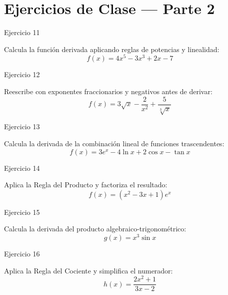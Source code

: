 \documentclass[aspectratio=169]{beamer}
\begin{document}
\section{Ejercicios de Clase — Parte 2}

\begin{frame}{Ejercicio 11}
  \begin{mwejercicio}
    Calcula la función derivada aplicando reglas de potencias y linealidad:
    $$f(x) = 4x^5 - 3x^3 + 2x - 7$$
  \end{mwejercicio}
  \vspace{3.5cm}
\end{frame}
\begin{frame}{Ejercicio 12}
  \begin{mwejercicio}
    Reescribe con exponentes fraccionarios y negativos antes de derivar:
    $$f(x) = 3\sqrt{x} - \frac{2}{x^2} + \frac{5}{\sqrt[3]{x}}$$
  \end{mwejercicio}
  \vspace{3.5cm}
\end{frame}
\begin{frame}{Ejercicio 13}
  \begin{mwejercicio}
    Calcula la derivada de la combinación lineal de funciones trascendentes:
    $$f(x) = 3e^x - 4\ln x + 2\cos x - \tan x$$
  \end{mwejercicio}
  \vspace{3.5cm}
\end{frame}
\begin{frame}{Ejercicio 14}
  \begin{mwejercicio}
    Aplica la Regla del Producto y factoriza el resultado:
    $$f(x) = (x^2 - 3x + 1) e^x$$
  \end{mwejercicio}
  \vspace{3.5cm}
\end{frame}
\begin{frame}{Ejercicio 15}
  \begin{mwejercicio}
    Calcula la derivada del producto algebraico-trigonométrico:
    $$g(x) = x^3 \sin x$$
  \end{mwejercicio}
  \vspace{3.5cm}
\end{frame}
\begin{frame}{Ejercicio 16}
  \begin{mwejercicio}
    Aplica la Regla del Cociente y simplifica el numerador:
    $$h(x) = \frac{2x^2 + 1}{3x - 2}$$
  \end{mwejercicio}
  \vspace{3.5cm}
\end{frame}
\end{document}
